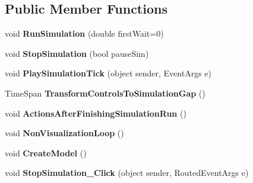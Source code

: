 \subsection*{Public Member Functions}
\begin{DoxyCompactItemize}
\item 
void {\bfseries Run\+Simulation} (double first\+Wait=0)\hypertarget{class_hi_co_simulator_1_1_main_window_ad94718b033fbfb0db807ab5760b616d7}{}\label{class_hi_co_simulator_1_1_main_window_ad94718b033fbfb0db807ab5760b616d7}

\item 
void {\bfseries Stop\+Simulation} (bool pause\+Sim)\hypertarget{class_hi_co_simulator_1_1_main_window_a6ab3dfbcd0e30f0336bdf0210d24cbb5}{}\label{class_hi_co_simulator_1_1_main_window_a6ab3dfbcd0e30f0336bdf0210d24cbb5}

\item 
void {\bfseries Play\+Simulation\+Tick} (object sender, Event\+Args e)\hypertarget{class_hi_co_simulator_1_1_main_window_a33965c1fb25e6bc12dee369315018a26}{}\label{class_hi_co_simulator_1_1_main_window_a33965c1fb25e6bc12dee369315018a26}

\item 
Time\+Span {\bfseries Transform\+Controls\+To\+Simulation\+Gap} ()\hypertarget{class_hi_co_simulator_1_1_main_window_a0d4ec1df606438c695c6bb5a5c629782}{}\label{class_hi_co_simulator_1_1_main_window_a0d4ec1df606438c695c6bb5a5c629782}

\item 
void {\bfseries Actions\+After\+Finishing\+Simulation\+Run} ()\hypertarget{class_hi_co_simulator_1_1_main_window_a4e5b9203c94993d723637f7520b0b2a7}{}\label{class_hi_co_simulator_1_1_main_window_a4e5b9203c94993d723637f7520b0b2a7}

\item 
void {\bfseries Non\+Visualization\+Loop} ()\hypertarget{class_hi_co_simulator_1_1_main_window_ae5a8a4aebb8087b2e7464b3c4955f1c4}{}\label{class_hi_co_simulator_1_1_main_window_ae5a8a4aebb8087b2e7464b3c4955f1c4}

\item 
void {\bfseries Create\+Model} ()\hypertarget{class_hi_co_simulator_1_1_main_window_a5a3ff8f648ebdb7b130cb5e1f8ba22c8}{}\label{class_hi_co_simulator_1_1_main_window_a5a3ff8f648ebdb7b130cb5e1f8ba22c8}

\item 
void {\bfseries Stop\+Simulation\+\_\+\+Click} (object sender, Routed\+Event\+Args e)\hypertarget{class_hi_co_simulator_1_1_main_window_aa5f57ddd04891a9761159ad7d4e87754}{}\label{class_hi_co_simulator_1_1_main_window_aa5f57ddd04891a9761159ad7d4e87754}


\end{DoxyCompactItemize}
